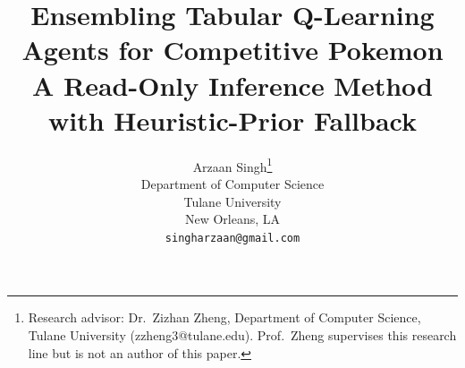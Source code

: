 \documentclass{article}
\title{Ensembling Tabular Q-Learning Agents for Competitive Pokemon\\
  A Read-Only Inference Method with Heuristic-Prior Fallback}
\author{
  Arzaan Singh\thanks{Research advisor: Dr.\ Zizhan Zheng, Department of
  Computer Science, Tulane University (zzheng3@tulane.edu).
  Prof.\ Zheng supervises this research line but is not an author of
  this paper.} \\
  Department of Computer Science \\
  Tulane University \\
  New Orleans, LA \\
  \texttt{singharzaan@gmail.com}
}
\begin{document}
\maketitle

\begin{abstract}

\end{abstract}












\appendix

\end{document}
